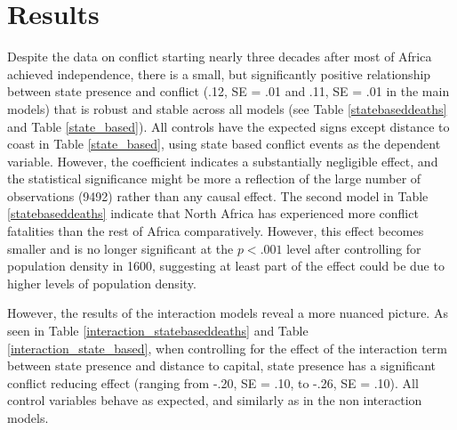 \documentclass[12pt]{article}
\begin{document}
\section{Results}

Despite the data on conflict starting nearly three decades after most of Africa
achieved independence, there is a small, but significantly positive relationship
between state presence and conflict (.12, SE = .01 and .11, SE = .01 in the main
models) that is robust and stable across all models (see Table
\ref{statebaseddeaths} and Table \ref{state_based}). All controls have the
expected signs except distance to coast in Table \ref{state_based}, using state
based conflict events as the dependent variable. However, the
coefficient indicates a substantially negligible effect, and the statistical
significance might be more a reflection of the large number of observations
(9492) rather than any causal effect. The second model in Table
\ref{statebaseddeaths} indicate that North Africa has experienced more conflict
fatalities than the rest of Africa comparatively. However, this effect becomes
smaller and is no longer significant at the $ p < .001 $ level after controlling
for population density in 1600, suggesting at least part of the effect could be
due to higher levels of population density.

However, the results of the interaction models reveal a more nuanced picture. As
seen in Table \ref{interaction_statebaseddeaths} and Table
\ref{interaction_state_based}, when controlling for the effect of the
interaction term between state presence and distance to capital, state presence
has a significant conflict reducing effect (ranging from -.20, SE = .10, to
-.26, SE = .10). All control variables behave as expected, and similarly as in
the non interaction models.
\end{document}
